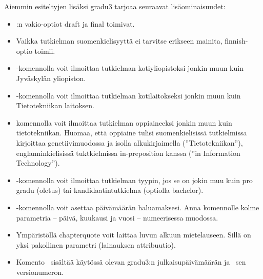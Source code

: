 \documentclass[utf8,bachelor]{gradu3}
\begin{document}
Aiemmin esiteltyjen lisäksi gradu3 tarjoaa seuraavat lisäominaisuudet:
\begin{itemize}
\item \LaTeXe:n vakio-optiot draft ja final toimivat.
\item Vaikka tutkielman suomenkielisyyttä ei tarvitse erikseen
  mainita, finnish-optio toimii.
\item \string\university-komennolla voit ilmoittaa tutkielman
  kotiyliopistoksi jonkin muun kuin Jyväskylän yliopiston.
\item  \string\department-komennolla voit ilmoittaa tutkielman
  kotilaitokseksi jonkin muun kuin Tietotekniikan laitoksen.
\item \string\subject-komennolla voit ilmoittaa tutkielman
  oppiaineeksi jonkin muun kuin tietotekniikan.  Huomaa, että oppiaine
  tulisi suomenkielisissä tutkielmissa kirjoittaa genetiivimuodossa ja
  isolla alkukirjaimella (''Tietotekniikan''), englanninkielisissä
  tuktkielmissa in-preposition kanssa (''in Information Technology'').
\item \string\type-komennolla voit ilmoittaa tutkielman tyypin, jos se
  on jokin muu kuin pro gradu (oletus) tai kandidaatintutkielma
  (optiolla bachelor).
\item \string\setdate-komennolla voit asettaa päivämäärän
  haluamaksesi.  Anna komennolle kolme parametria -- päivä,
  kuukausi ja vuosi -- numeerisessa muodossa.
\item Ympäristöllä chapterquote voit laittaa luvun alkuun
  mietelauseen.  Sillä on yksi pakollinen parametri (lainauksen
  attribuutio).
\item Komento \string\graduclsdate\ sisältää käytössä olevan gradu3:n
  julkaisupäivämäärän ja \string\graduclsversion\ sen versionumeron.
\end{itemize}
\end{document}
